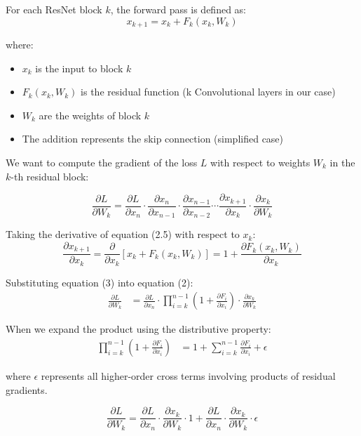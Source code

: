 \documentclass[12pt,a4paper,twoside]{article}
\theoremstyle{definition}
\begin{document}
For each ResNet block $k$, the forward pass is defined as:
\begin{equation}
x_{k+1} = x_k + F_k(x_k, W_k)
\end{equation}

where:
\begin{itemize}
    \item $x_k$ is the input to block $k$
    \item $F_k(x_k, W_k)$ is the residual function (k Convolutional layers in our case)
    \item $W_k$ are the weights of block $k$
    \item The addition represents the skip connection (simplified case)
\end{itemize}

 We want to compute the gradient of the loss $L$ with respect to weights $W_k$ in the $k$-th residual block:

\begin{equation}
\frac{\partial L}{\partial W_k} = \frac{\partial L}{\partial x_n} \cdot \frac{\partial x_n}{\partial x_{n-1}} \cdot \frac{\partial x_{n-1}}{\partial x_{n-2}} \cdots \frac{\partial x_{k+1}}{\partial x_k} \cdot \frac{\partial x_k}{\partial W_k}
\end{equation}


Taking the derivative of equation (2.5) with respect to $x_k$:
\begin{equation}
\frac{\partial x_{k+1}}{\partial x_k} = \frac{\partial}{\partial x_k}[x_k + F_k(x_k, W_k)] = 1 + \frac{\partial F_k(x_k, W_k)}{\partial x_k}
\end{equation}

Substituting equation (3) into equation (2):
\begin{align}
\frac{\partial L}{\partial W_k} &= \frac{\partial L}{\partial x_n} \cdot \prod_{i=k}^{n-1} \left(1 + \frac{\partial F_i}{\partial x_i}\right) \cdot \frac{\partial x_k}{\partial W_k}
\end{align}

When we expand the product using the distributive property:
\begin{align}
\prod_{i=k}^{n-1} \left(1 + \frac{\partial F_i}{\partial x_i}\right) 
&= 1 + \sum_{i=k}^{n-1} \frac{\partial F_i}{\partial x_i} + \epsilon
\end{align}

where $\epsilon$ represents all higher-order cross terms involving products of residual gradients.

\begin{equation}
\frac{\partial L}{\partial W_k} = \frac{\partial L}{\partial x_n} \cdot \frac{\partial x_k}{\partial W_k} \cdot 1 + \frac{\partial L}{\partial x_n} \cdot \frac{\partial x_k}{\partial W_k} \cdot \epsilon
\end{equation}
\end{document}
